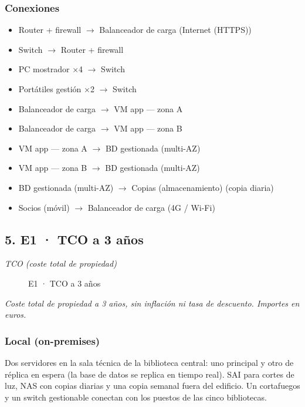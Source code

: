 \subsubsection*{Conexiones}

\begin{itemize}
\item Router + firewall $\rightarrow$ Balanceador de carga (Internet (HTTPS))
\item Switch $\rightarrow$ Router + firewall
\item PC mostrador ×4 $\rightarrow$ Switch
\item Portátiles gestión ×2 $\rightarrow$ Switch
\item Balanceador de carga $\rightarrow$ VM app — zona A
\item Balanceador de carga $\rightarrow$ VM app — zona B
\item VM app — zona A $\rightarrow$ BD gestionada (multi-AZ)
\item VM app — zona B $\rightarrow$ BD gestionada (multi-AZ)
\item BD gestionada (multi-AZ) $\rightarrow$ Copias (almacenamiento) (copia diaria)
\item Socios (móvil) $\rightarrow$ Balanceador de carga (4G / Wi-Fi)
\end{itemize}

\subsection*{5. E1 · TCO a 3 años}

\emph{TCO (coste total de propiedad)}

\begin{figure}[H]
\centering
{}
\caption{E1 · TCO a 3 años}
\end{figure}

\emph{Coste total de propiedad a 3 años, sin inflación ni tasa de descuento. Importes en euros.}

\subsubsection*{Local (on-premises)}

Dos servidores en la sala técnica de la biblioteca central: uno principal y otro de réplica en espera (la base de datos se replica en tiempo real). SAI para cortes de luz, NAS con copias diarias y una copia semanal fuera del edificio. Un cortafuegos y un switch gestionable conectan con los puestos de las cinco bibliotecas.

